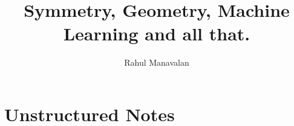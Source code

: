 \documentclass{article}
\title{Symmetry, Geometry, Machine Learning and all that.}
\author{Rahul Manavalan}
\date{}
\begin{document}
\maketitle

\section{Unstructured Notes}
\end{document}
